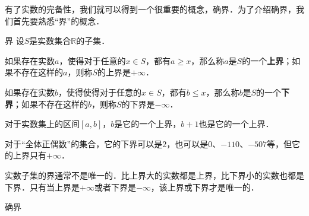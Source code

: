 
\begin{issues}
\issueDraft
\end{issues}


有了实数的完备性，我们就可以得到一个很重要的概念，确界．为了介绍确界，我们首先要熟悉“界”的概念．

\begin{definition}{界}
设$S$是实数集合$\mathbb{R}$的子集．

如果存在实数$a$，使得对于任意的$x\in S$，都有$a\geq x$，那么称$a$是$S$的一个\textbf{上界}；如果不存在这样的$a$，则称$S$的上界是$+\infty$．

如果存在实数$b$，使得使得对于任意的$x\in S$，都有$b\leq x$，那么称$b$是$S$的一个\textbf{下界}；如果不存在这样的$b$，则称$S$的下界是$-\infty$．
\end{definition}

\begin{example}{}
对于实数集上的区间$[a, b]$，$b$是它的一个上界，$b+1$也是它的一个上界．

对于“全体正偶数”的集合，它的下界可以是$2$，也可以是$0$、$-110$、$-507$等，但它的上界只有$+\infty$．
\end{example}

实数子集的界通常不是唯一的．比上界大的实数都是上界，比下界小的实数也都是下界．只有当上界是$+\infty$或者下界是$-\infty$，该上界或下界才是唯一的．



\begin{definition}{确界}

\end{definition}






















